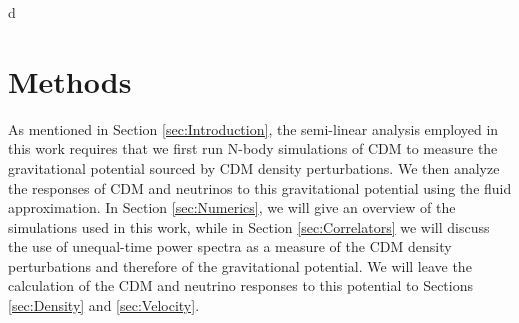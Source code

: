 \documentclass[twocolumn,superscriptaddress,prd]{revtex4}
\makeatletter
\def \ie {{\it i.e.}, }
\let\save@mathaccent\mathaccent
\newcommand*\if@single[3]{%
  \setbox0\hbox{${\mathaccent"0362{#1}}^H$}%
  \setbox2\hbox{${\mathaccent"0362{\kern0pt#1}}^H$}%
  \ifdim\ht0=\ht2 #3\else #2\fi
  }
\newcommand*\rel@kern[1]{\kern#1\dimexpr\macc@kerna}
\newcommand*\widebar[1]{\@ifnextchar^{{\wide@bar{#1}{0}}}{\wide@bar{#1}{1}}}
\newcommand*\wide@bar[2]{\if@single{#1}{\wide@bar@{#1}{#2}{1}}{\wide@bar@{#1}{#2}{2}}}
\newcommand*\wide@bar@[3]{%
  \begingroup
  \def\mathaccent##1##2{%
    \let\mathaccent\save@mathaccent
    \if#32 \let\macc@nucleus\first@char \fi
    \setbox\z@\hbox{$\macc@style{\macc@nucleus}_{}$}%
    \setbox\tw@\hbox{$\macc@style{\macc@nucleus}{}_{}$}%
    \dimen@\wd\tw@
    \advance\dimen@-\wd\z@
    \divide\dimen@ 3
    \@tempdima\wd\tw@
    \advance\@tempdima-\scriptspace
    \divide\@tempdima 10
    \advance\dimen@-\@tempdima
    \ifdim\dimen@>\z@ \dimen@0pt\fi
    \rel@kern{0.6}\kern-\dimen@
    \if#31
      \overline{\rel@kern{-0.6}\kern\dimen@\macc@nucleus\rel@kern{0.4}\kern\dimen@}%
      \advance\dimen@0.4\dimexpr\macc@kerna
      \let\final@kern#2%
      \ifdim\dimen@<\z@ \let\final@kern1\fi
      \if\final@kern1 \kern-\dimen@\fi
    \else
      \overline{\rel@kern{-0.6}\kern\dimen@#1}%
    \fi
  }%
  \macc@depth\@ne
  \let\math@bgroup\@empty \let\math@egroup\macc@set@skewchar
  \mathsurround\z@ \frozen@everymath{\mathgroup\macc@group\relax}%
  \macc@set@skewchar\relax
  \let\mathaccentV\macc@nested@a
  \if#31
    \macc@nested@a\relax111{#1}%
  \else
    \def\gobble@till@marker##1\endmarker{}%
    \futurelet\first@char\gobble@till@marker#1\endmarker
    \ifcat\noexpand\first@char A\else
      \def\first@char{}%
    \fi
    \macc@nested@a\relax111{\first@char}%
  \fi
  \endgroup
}
\makeatother
\begin{document}

d%

\section{Methods}   
\label{sec:Methods}

As mentioned in Section \ref{sec:Introduction}, the semi-linear
analysis employed in this work requires that we first run N-body
simulations of CDM to measure
the gravitational potential sourced by CDM density
perturbations.  We then analyze the responses of CDM and 
neutrinos to this gravitational potential using the fluid approximation.  In Section
\ref{sec:Numerics}, we will give an overview of the simulations used in
this work, while in Section \ref{sec:Correlators} we will discuss the
use of unequal-time power spectra as a measure of the CDM
density perturbations and therefore of the gravitational potential.
We will leave the calculation of the CDM and neutrino
responses to this
potential to Sections \ref{sec:Density} and \ref{sec:Velocity}.
\end{document}
